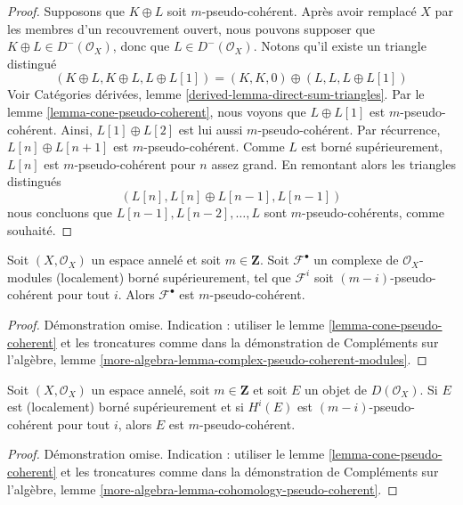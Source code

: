 {\begin{proof}
Supposons que $K \oplus L$ soit $m$-pseudo-cohérent. Après avoir remplacé $X$ par les membres d'un recouvrement ouvert, nous pouvons supposer que $K \oplus L \in D^-(\mathcal{O}_X)$, donc que
$L \in D^-(\mathcal{O}_X)$. Notons qu'il existe un triangle distingué
$$
(K \oplus L, K \oplus L, L \oplus L[1]) =
(K, K, 0) \oplus (L, L, L \oplus L[1])
$$
Voir Catégories dérivées, lemme \ref{derived-lemma-direct-sum-triangles}. Par le lemme \ref{lemma-cone-pseudo-coherent},
nous voyons que $L \oplus L[1]$ est $m$-pseudo-cohérent. Ainsi, $L[1] \oplus L[2]$ est lui aussi $m$-pseudo-cohérent. Par récurrence, $L[n] \oplus L[n + 1]$ est $m$-pseudo-cohérent. Comme $L$ est borné supérieurement, $L[n]$ est $m$-pseudo-cohérent pour $n$ assez grand. En remontant alors les triangles distingués
$$
(L[n], L[n] \oplus L[n - 1], L[n - 1])
$$
nous concluons que $L[n - 1], L[n - 2], \ldots, L$ sont $m$-pseudo-cohérents, comme souhaité.

\end{proof}

\begin{lemma}

\label{lemma-complex-pseudo-coherent-modules}
Soit $(X, \mathcal{O}_X)$ un espace annelé et soit $m \in \mathbf{Z}$. Soit $\mathcal{F}^\bullet$ un complexe de $\mathcal{O}_X$-modules (localement) borné supérieurement, tel que $\mathcal{F}^i$ soit $(m - i)$-pseudo-cohérent pour tout $i$. Alors $\mathcal{F}^\bullet$ est $m$-pseudo-cohérent.
\end{lemma}

\begin{proof}
Démonstration omise. Indication : utiliser le lemme \ref{lemma-cone-pseudo-coherent} et les troncatures comme dans la démonstration de Compléments sur l'algèbre, lemme \ref{more-algebra-lemma-complex-pseudo-coherent-modules}.
\end{proof}

\begin{lemma}

\label{lemma-cohomology-pseudo-coherent}
Soit $(X, \mathcal{O}_X)$ un espace annelé, soit $m \in \mathbf{Z}$ et soit $E$ un objet de $D(\mathcal{O}_X)$. Si $E$ est (localement) borné supérieurement et si $H^i(E)$ est $(m - i)$-pseudo-cohérent pour tout $i$, alors $E$ est $m$-pseudo-cohérent.
\end{lemma}

\begin{proof}
Démonstration omise. Indication : utiliser le lemme \ref{lemma-cone-pseudo-coherent} et les troncatures comme dans la démonstration de Compléments sur l'algèbre, lemme \ref{more-algebra-lemma-cohomology-pseudo-coherent}.
\end{proof}

}

